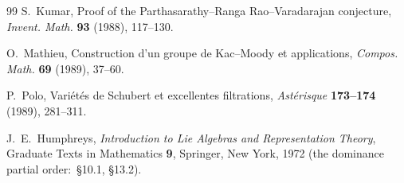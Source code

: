 \documentclass[11pt,a4paper]{article}
\theoremstyle{plain}
\theoremstyle{definition}
\begin{document}
\begin{thebibliography}{99}
S.~Kumar,
\newblock Proof of the Parthasarathy--Ranga Rao--Varadarajan
conjecture,
\newblock \emph{Invent. Math.} \textbf{93} (1988), 117--130.

O.~Mathieu,
\newblock Construction d'un groupe de Kac--Moody et applications,
\newblock \emph{Compos. Math.} \textbf{69} (1989), 37--60.

P.~Polo,
\newblock Vari\'et\'es de Schubert et excellentes filtrations,
\newblock \emph{Ast\'erisque} \textbf{173--174} (1989), 281--311.

J.~E.~Humphreys,
\newblock \emph{Introduction to Lie Algebras and Representation Theory},
\newblock Graduate Texts in Mathematics \textbf{9}, Springer, New York, 1972
(the dominance partial order:\ \S10.1, \S13.2).

\end{thebibliography}
\end{document}
